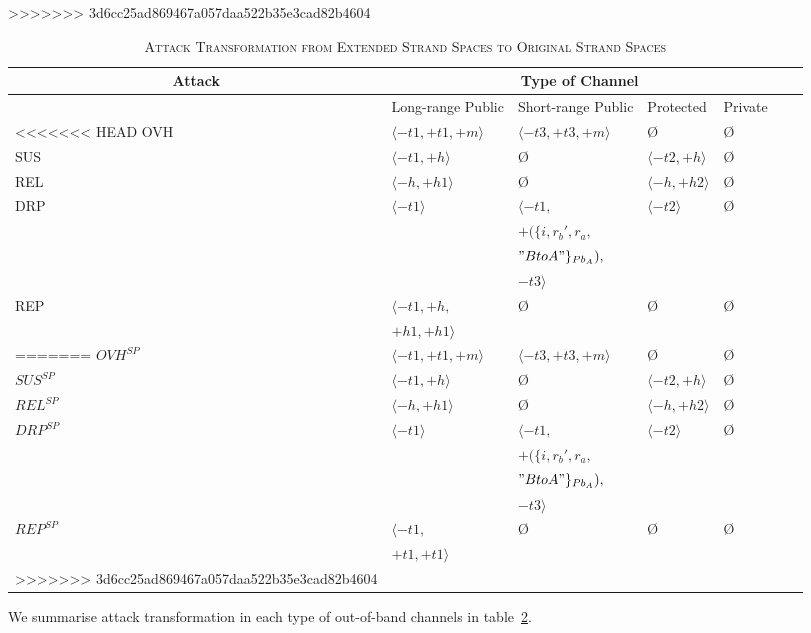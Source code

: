 \begin{Definition}
\begin{table}[b]
\begin{table}[b]
\centering
\caption{\textsc{Attack Transformation from Extended Strand Spaces to Original Strand Spaces}}
>>>>>>> 3d6cc25ad869467a057daa522b35e3cad82b4604
\label{attacktrans}
{\scriptsize
\begin{tabular}{ l l l l l l l }
\hline
\multicolumn{1}{c}{Attack} & \multicolumn{4}{c}{Type of Channel} \\
\hline
\hline
 & Long-range Public & Short-range Public & Protected & Private \\
\hline\hline
<<<<<<< HEAD
OVH & $\langle -t1,+t1,+m \rangle$ & $ \langle -t3,+t3,+m \rangle$ & \O & \O \\ \hline
SUS & $ \langle -t1, +h \rangle$ & \O & $ \langle -t2,+h \rangle$ & \O \\ \hline
REL & $\langle -h, +h1 \rangle$ & \O & $ \langle -h,+h2 \rangle$ & \O \\ \hline
DRP & $ \langle -t1 \rangle$ & $ \langle -t1,$ & $\langle -t2 \rangle$ & \O \\
  &  & $+(\{i,r_b',r_a,$ & \\
  &  & $"BtoA"\}_{Pb_A}),$ & \\
  &  & $-t3 \rangle$ & \\ \hline
REP & $ \langle -t1, +h,$ & \O & \O & \O \\
 	& $+h1,+h1 \rangle$& & &\\ \hline
=======
$OVH^{SP}$ & $\langle -t1,+t1,+m \rangle$ & $ \langle -t3,+t3,+m \rangle$ & \O & \O \\ \hline
$SUS^{SP}$ & $ \langle -t1, +h \rangle$ & \O & $ \langle -t2,+h \rangle$ & \O \\ \hline
$REL^{SP}$ & $\langle -h, +h1 \rangle$ & \O & $ \langle -h,+h2 \rangle$ & \O \\ \hline
$DRP^{SP}$ & $ \langle -t1 \rangle$ & $ \langle -t1,$ & $\langle -t2 \rangle$ & \O \\
  &  & $+(\{i,r_b',r_a,$ & \\
  &  & $"BtoA"\}_{Pb_A}),$ & \\
  &  & $-t3 \rangle$ & \\ \hline
$REP^{SP}$ & $ \langle -t1, $ & \O & \O & \O \\
 	& $+t1,+t1 \rangle$& & &\\ \hline
>>>>>>> 3d6cc25ad869467a057daa522b35e3cad82b4604
\end{tabular}
}
\end{table}

We summarise attack transformation in each type of out-of-band channels in table~\ref{attacktrans}.


\end{table}
\end{Definition}
